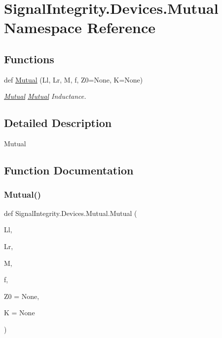 \hypertarget{namespaceSignalIntegrity_1_1Devices_1_1Mutual}{}\section{Signal\+Integrity.\+Devices.\+Mutual Namespace Reference}
\label{namespaceSignalIntegrity_1_1Devices_1_1Mutual}
\subsection*{Functions}
\begin{DoxyCompactItemize}
\item 
def \hyperlink{namespaceSignalIntegrity_1_1Devices_1_1Mutual_afd907d0061f13783b261b76e3dbd45d4}{Mutual} (Ll, Lr, M, f, Z0=None, K=None)
\begin{DoxyCompactList}\small\item\em \hyperlink{namespaceSignalIntegrity_1_1Devices_1_1Mutual}{Mutual} \hyperlink{namespaceSignalIntegrity_1_1Devices_1_1Mutual}{Mutual} Inductance. \end{DoxyCompactList}\end{DoxyCompactItemize}


\subsection{Detailed Description}
\begin{DoxyVerb}Mutual\end{DoxyVerb}
 

\subsection{Function Documentation}
\mbox{\label{namespaceSignalIntegrity_1_1Devices_1_1Mutual_afd907d0061f13783b261b76e3dbd45d4}} 
\subsubsection{\texorpdfstring{Mutual()}{Mutual()}}
{\footnotesize\ttfamily def Signal\+Integrity.\+Devices.\+Mutual.\+Mutual (\begin{DoxyParamCaption}\item[{}]{Ll,  }\item[{}]{Lr,  }\item[{}]{M,  }\item[{}]{f,  }\item[{}]{Z0 = {\ttfamily None},  }\item[{}]{K = {\ttfamily None} }\end{DoxyParamCaption})}



